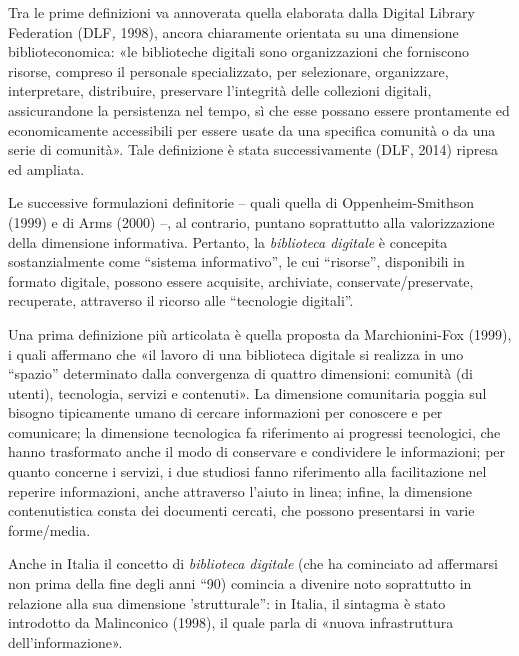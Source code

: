 \documentclass[
  b5paper,
  twoside,
  12pt,
  chapterprefix=false,
  bibliography=totocnumbered,
  parskip=false]{scrbook}
\begin{document}
Tra le prime definizioni va annoverata quella elaborata dalla Digital
Library Federation (DLF\emph{,} 1998), ancora chiaramente orientata su una
dimensione biblioteconomica: «le biblioteche digitali sono
organizzazioni che forniscono risorse, compreso il personale
specializzato, per selezionare, organizzare, interpretare, distribuire,
preservare l'integrità delle collezioni digitali, assicurandone la
persistenza nel tempo, sì che esse possano essere prontamente ed
economicamente accessibili per essere usate da una specifica comunità o
da una serie di comunità». Tale definizione è stata successivamente
(DLF, 2014) ripresa ed ampliata.

Le successive formulazioni definitorie -- quali quella di
Oppenheim-Smithson (1999) e di Arms (2000) --, al contrario, puntano
soprattutto alla valorizzazione della dimensione informativa. Pertanto,
la \emph{biblioteca digitale} è concepita sostanzialmente come \enquote{sistema
informativo}, le cui \enquote{risorse}, disponibili in formato digitale, possono
essere acquisite, archiviate, conservate/preservate, recuperate,
attraverso il ricorso alle \enquote{tecnologie digitali}.

Una prima definizione più articolata è quella proposta da
Marchionini-Fox (1999), i quali affermano che «il lavoro di una
biblioteca digitale si realizza in uno \enquote{spazio} determinato dalla
convergenza di quattro dimensioni: comunità (di utenti), tecnologia,
servizi e contenuti». La dimensione comunitaria poggia sul bisogno
tipicamente umano di cercare informazioni per conoscere e per
comunicare; la dimensione tecnologica fa riferimento ai progressi
tecnologici, che hanno trasformato anche il modo di conservare e
condividere le informazioni; per quanto concerne i servizi, i due
studiosi fanno riferimento alla facilitazione nel reperire informazioni,
anche attraverso l'aiuto in linea; infine, la dimensione contenutistica
consta dei documenti cercati, che possono presentarsi in varie
forme/media.

Anche in Italia il concetto di \emph{biblioteca digitale} (che ha cominciato
ad affermarsi non prima della fine degli anni \enquote{90) comincia a divenire
noto soprattutto in relazione alla sua dimensione 'strutturale}: in
Italia, il sintagma è stato introdotto da Malinconico (1998), il quale
parla di «nuova infrastruttura dell'informazione».
\end{document}
